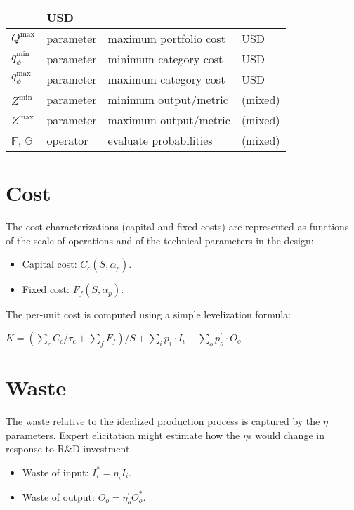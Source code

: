 \documentclass[letterpaper,10pt,english]{sphinxmanual}
\begin{document}
\begin{savenotes}
\begin{longtable}{|l|l|l|l|}
&
USD
\\
\hline
\(Q^\mathrm{max}\)
&
parameter
&
maximum portfolio cost
&
USD
\\
\hline
\(q^\mathrm{min}_\phi\)
&
parameter
&
minimum category cost
&
USD
\\
\hline
\(q^\mathrm{max}_\phi\)
&
parameter
&
maximum category cost
&
USD
\\
\hline
\(Z^\mathrm{min}\)
&
parameter
&
minimum output/metric
&
(mixed)
\\
\hline
\(Z^\mathrm{max}\)
&
parameter
&
maximum output/metric
&
(mixed)
\\
\hline
\(\mathbb{F}\), \(\mathbb{G}\)
&
operator
&
evaluate probabilities
&
(mixed)
\\
\hline
\end{longtable}\sphinxatlongtableend\end{savenotes}


\section{Cost}
\label{\detokenize{formulation:cost}}
The cost characterizations (capital and fixed costs) are represented as
functions of the scale of operations and of the technical parameters in
the design:
\begin{itemize}
\item {} 
Capital cost: \(C_c(S, \alpha_p)\).

\item {} 
Fixed cost: \(F_f(S, \alpha_p)\).

\end{itemize}

The per-unit cost is computed using a simple levelization formula:

\(K = \left( \sum_c C_c / \tau_c + \sum_f F_f \right) / S + \sum_i p_i \cdot I_i - \sum_o p^\prime_o \cdot O_o\)


\section{Waste}
\label{\detokenize{formulation:waste}}
The waste relative to the idealized production process is captured by
the \(\eta\) parameters. Expert elicitation might estimate how the
\(\eta\)s would change in response to R\&D investment.
\begin{itemize}
\item {} 
Waste of input: \(I^*_i = \eta_i I_i\).

\item {} 
Waste of output: \(O_o = \eta^\prime_o O^*_o\).

\end{itemize}
\end{document}
